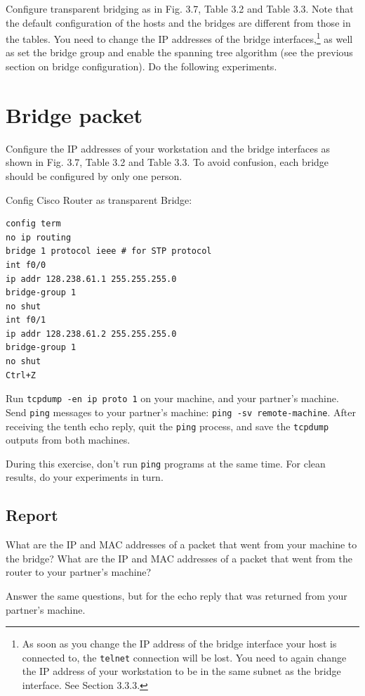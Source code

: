 \documentclass{../UTNetLab}
\begin{document}
    Configure transparent bridging as in Fig.
    3.7, Table 3.2 and Table 3.3.
    Note that the default configuration of the hosts and the bridges are different from those in the tables.
    You need to change the IP addresses of the bridge interfaces,\footnote{As soon as you change the IP address of the bridge interface your host is connected to, the \lstinline{telnet} connection will be lost.
    You need to again change the IP address of your workstation to be in the same subnet as the bridge interface. See Section 3.3.3.} as well as set the bridge group and enable the spanning tree algorithm (see the previous section on bridge configuration).
    Do the following experiments.

\section{Bridge packet}
    Configure the IP addresses of your workstation and the bridge interfaces as shown in Fig. 3.7, Table 3.2 and Table 3.3.
    To avoid confusion, each bridge should be configured by only one person.

    Config Cisco Router as transparent Bridge:
    \begin{lstlisting}[language={cisco}]
config term
no ip routing
bridge 1 protocol ieee # for STP protocol
int f0/0
ip addr 128.238.61.1 255.255.255.0
bridge-group 1
no shut
int f0/1
ip addr 128.238.61.2 255.255.255.0
bridge-group 1
no shut
Ctrl+Z
    \end{lstlisting}
    
    Run \lstinline{tcpdump -en ip proto 1} on your machine, and your partner’s machine. Send \lstinline{ping} messages to your partner’s machine: \lstinline[emph={your-host, remote-host}]{ping -sv remote-machine}.
    After receiving the tenth echo reply, quit the \lstinline{ping} process, and save the \lstinline{tcpdump} outputs from both machines.

    During this exercise, don’t run \lstinline{ping} programs at the same time. For clean results, do your experiments in turn.
    
    \subsection*{Report}
    What are the IP and MAC addresses of a packet that went from your machine to the bridge?
    What are the IP and MAC addresses of a packet that went from the router to your partner’s machine?

    Answer the same questions, but for the echo reply that was returned from your partner’s machine.
\end{document}
